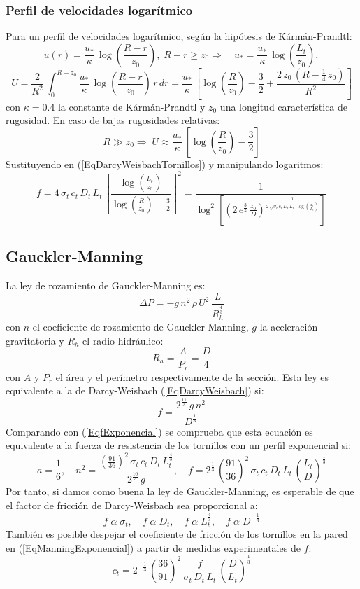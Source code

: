 \documentclass[a4paper]{article}
\newcommand{\EQ}[2]{\begin{equation}#1\label{#2}\end{equation}}
\begin{document}
\subsubsection{Perfil de velocidades logarítmico}

Para un perfil de velocidades logarítmico, según la hipótesis de Kármán-Prandtl:
\[
  u(r)=\frac{u_*}{\kappa}
  \,\log\left(\frac{R-r}{z_0}\right),\;R-r\geq z_0\Rightarrow\quad
  u_*=\frac{u_*}{\kappa}\,\log\left(\frac{L_t}{z_0}\right),\]
\EQ
{
  U=\frac2{R^2}\,\int_0^{R-z_0}
  \frac{u_*}{\kappa}\,\log\left(\frac{R-r}{z_0}\right)\,r\,dr
  =\frac{u_*}{\kappa}\,\left[\log\left(\frac{R}{z_0}\right)-\frac32
  +\frac{2\,z_0\,\left(R-\frac14\,z_0\right)}{R^2}\right]
}{EqULogaritmico}
con $\kappa=0.4$ la constante de Kármán-Prandtl y $z_0$ una longitud
característica de rugosidad. En caso de bajas rugosidades relativas:
\EQ
{
  R\gg z_0\Rightarrow\;
  U\approx\frac{u_*}{\kappa}
  \,\left[\log\left(\frac{R}{z_0}\right)-\frac32\right]
}{EqULogaritmicoAproximado}
Sustituyendo en (\ref{EqDarcyWeisbachTornillos}) y manipulando logaritmos:
\EQ
{
  f=4\,\sigma_t\,c_t\,D_t\,L_t\,\left[\frac{\log\left(\frac{L_t}{z_0}\right)}
  {\log\left(\frac{R}{z_0}\right)-\frac32}\right]^2
  =\frac1{\log^2\left[\left(2\,e^{\frac32}\,\frac{z_0}{D}\right)^{\frac1{2\,
  \sqrt{\sigma_t\,c_t\,D_t\,L_t}\,\log\left(\frac{z_0}{L_t}\right)}}\right]}
}{EqfLogaritmico}

\subsection{Gauckler-Manning}

La ley de rozamiento de Gauckler-Manning es:
\EQ{\Delta P=-g\,n^2\,\rho\,U^2\,\frac{L}{R_h^{\frac43}}}{EqGaucklerManning}
con $n$ el coeficiente de rozamiento de Gauckler-Manning, $g$ la aceleración
gravitatoria y $R_h$ el radio hidráulico:
\EQ{R_h=\frac{A}{P_r}=\frac{D}{4}}{EqRadioHidraulico}
con $A$ y $P_r$ el área y el perímetro respectivamente de la sección. Esta ley
es equivalente a la de Darcy-Weisbach (\ref{EqDarcyWeisbach}) si:
\EQ{f=\frac{2^{\frac{11}{3}}\,g\,n^2}{D^{\frac13}}}{EqDarcyWeisbachManning}
Comparando con (\ref{EqfExponencial}) se comprueba que esta ecuación es
equivalente a la fuerza de resistencia de los tornillos con un perfil
exponencial si:
\EQ
{
  a=\frac16,\quad
  n^2=\frac{\left(\frac{91}{36}\right)^2\,\sigma_t\,c_t\,D_t\,L_t^{\frac43}}
  {2^{\frac{10}{3}}\,g},\quad
  f=2^{\frac13}\,\left(\frac{91}{36}\right)^2\,\sigma_t\,c_t\,D_t\,L_t
  \,\left(\frac{L_t}{D}\right)^{\frac13}
}{EqManningExponencial}
Por tanto, si damos como buena la ley de Gauckler-Manning, es esperable de
que el factor de fricción de Darcy-Weisbach sea proporcional a:
\EQ
{
  f\;\alpha\;\sigma_t,\quad
  f\;\alpha\;D_t,\quad
  f\;\alpha\;L_t^{\frac43},\quad
  f\;\alpha\;D^{-\frac13}
}{EqfExponencialFactoresManning}
También es posible despejar el coeficiente de fricción de los tornillos en la
pared en (\ref{EqManningExponencial}) a partir de medidas experimentales de $f$:
\EQ
{
  c_t=2^{-\frac13}\,\left(\frac{36}{91}\right)^2\,\frac{f}{\sigma_t\,D_t\,L_t}
  \,\left(\frac{D}{L_t}\right)^{\frac13}
}{EqManningct}
\end{document}
